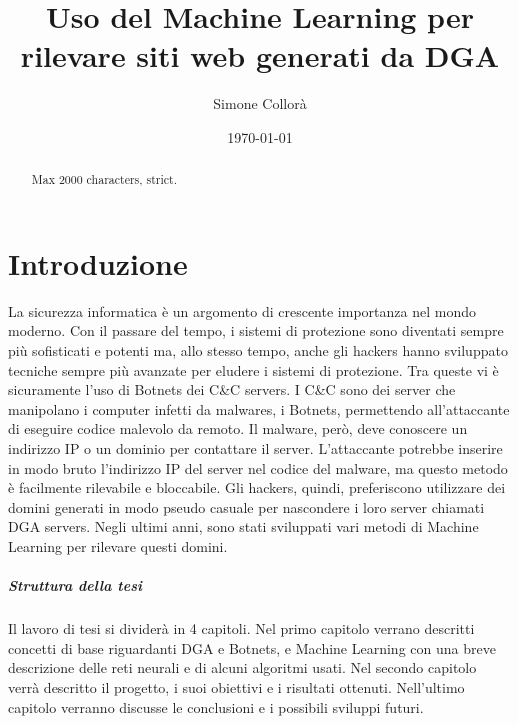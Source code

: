 \documentclass[12pt,a4paper,openright,twoside]{book}
\title{Uso del Machine Learning per rilevare siti web generati da DGA}
\author{Simone Collorà}
\date{\today}
\begin{document}
\frontmatter\frontispiece
\nocite{*}

\begin{abstract}	
Max 2000 characters, strict.
\end{abstract}



\tableofcontents   
\listoffigures     %

\mainmatter

\chapter{Introduzione}
\label{chap:introduction}

La sicurezza informatica è un argomento di crescente importanza
nel mondo moderno. Con il passare del tempo,
i sistemi di protezione sono diventati sempre più sofisticati
e potenti ma, allo stesso tempo, anche gli hackers 
hanno sviluppato tecniche sempre più avanzate per eludere i sistemi di protezione.
Tra queste vi è sicuramente l'uso di Botnets
dei \acrfull{C&C} servers. I \acrshort{C&C} sono dei server che manipolano
i computer infetti da malwares, i Botnets, permettendo
all'attaccante di eseguire codice malevolo da remoto.
Il malware, però, deve conoscere un indirizzo IP o un dominio
per contattare il server. L'attaccante potrebbe
inserire in modo bruto l'indirizzo IP del server nel codice del malware,
ma questo metodo è facilmente rilevabile e bloccabile.
Gli hackers, quindi, preferiscono utilizzare dei domini
generati in modo pseudo casuale per nascondere i loro server chiamati
\acrfull{DGA} servers. Negli ultimi anni, sono stati sviluppati
vari metodi di Machine Learning per rilevare questi domini.



\paragraph{Struttura della tesi}
Il lavoro di tesi si dividerà in 4 capitoli. Nel primo
capitolo verrano descritti concetti di base riguardanti \acrshort{DGA} e Botnets,
e Machine Learning con una breve descrizione delle reti neurali e di alcuni
algoritmi usati. Nel secondo capitolo verrà descritto il progetto,
i suoi obiettivi e i risultati ottenuti. Nell'ultimo capitolo
verranno discusse le conclusioni e i possibili sviluppi futuri.
\end{document}
